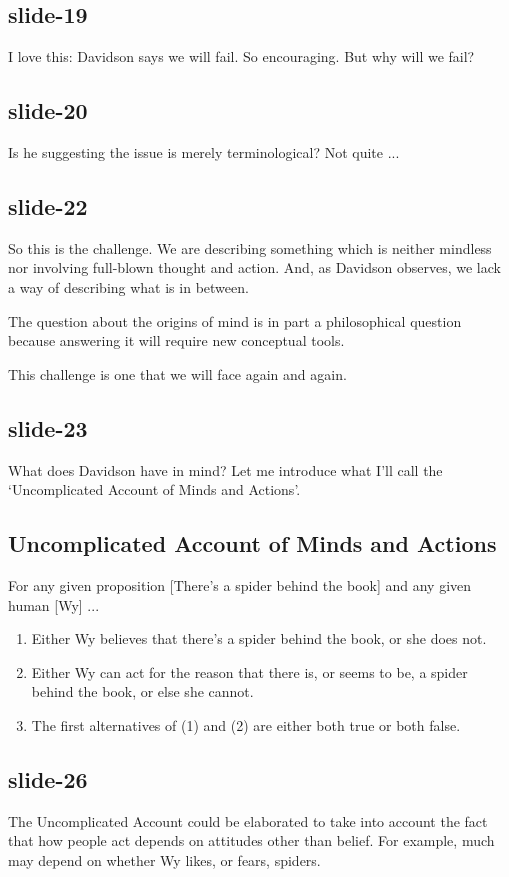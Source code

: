 \documentclass[12pt,\papersize]{extarticle}
\begin{document}
\subsection{slide-19}
I love this: Davidson says we will fail.  So encouraging.
But why will we fail?

\subsection{slide-20}
Is he suggesting the issue is merely terminological?  Not quite ...

\subsection{slide-22}
So this is the challenge.  We are describing something which is neither mindless
nor involving full-blown thought and action.  And, as Davidson observes, we lack
a way of describing what is in between.

The question about the origins of mind is in part a philosophical question because
answering it will require new conceptual tools.

This challenge is one that we will face again and again.

\subsection{slide-23}
What does Davidson have in mind?  Let me introduce
what I’ll call the ‘Uncomplicated Account of Minds and Actions’.

\subsection{Uncomplicated Account of Minds and Actions}
For any given proposition [There’s a spider behind the book] and any given human [Wy]
...
\begin{enumerate}
\item Either Wy believes that there’s a spider behind the book, or she does not.
\item Either Wy can act for the reason that there is, or seems to be, a spider behind the book, or else she cannot.
\item The first alternatives of (1) and (2) are either both true or both false.
\end{enumerate}

\subsection{slide-26}
The Uncomplicated Account could be elaborated to take into account
the fact that how people act depends on attitudes other than belief.
For example, much may depend on whether Wy likes, or fears, spiders.
\end{document}
